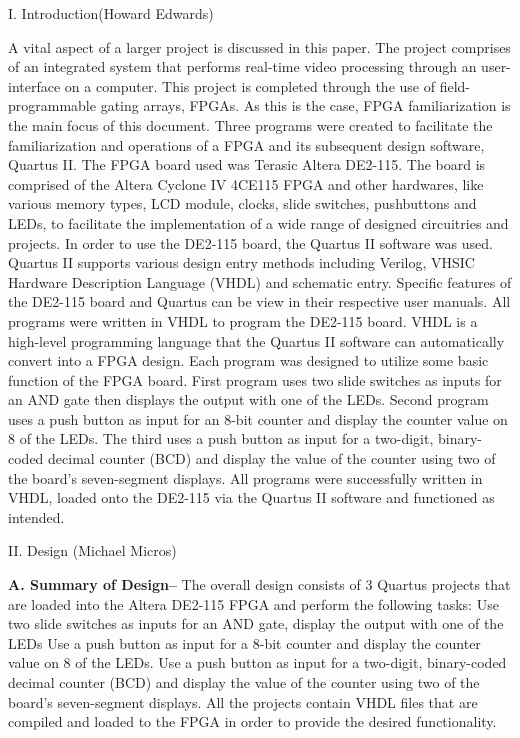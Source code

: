 \documentclass{article}
\begin{document}
\begin{multicols*}{2}
\begin{center}
\large{I. Introduction(Howard Edwards)}
\end{center}
A vital aspect of a larger project is discussed in this paper. The project comprises of an integrated system that performs real-time video processing through an user-interface on a computer. This project is completed through the use of field-programmable gating arrays, FPGAs. As this is the case, FPGA familiarization is the main focus of this document. Three programs were created to facilitate the familiarization and operations of a FPGA and its subsequent design software, Quartus II.
The FPGA board used was Terasic Altera DE2-115. The board is comprised of the Altera Cyclone IV 4CE115 FPGA and other hardwares, like various memory types, LCD module, clocks, slide switches, pushbuttons and LEDs, to facilitate the implementation of a wide range of designed circuitries and projects. In order to use the DE2-115 board, the Quartus II software was used. Quartus II supports various design entry methods including Verilog, VHSIC Hardware Description Language (VHDL) and schematic entry. Specific features of the DE2-115 board and Quartus can be view in their respective user manuals.
All programs were written in VHDL to program the DE2-115 board. VHDL is a high-level programming language that the Quartus II software can automatically convert into a FPGA design. Each program was designed to utilize some basic function of the FPGA board. First program uses two slide switches as inputs for an AND gate then displays the output with one of the LEDs. Second program uses a push button as input for an 8-bit counter and display the counter value on 8 of the LEDs. The third uses a push button as input for a two-digit, binary-coded decimal counter (BCD) and display the value of the counter using two of the board's seven-segment displays. All programs were successfully written in VHDL, loaded onto the DE2-115 via the Quartus II software and functioned as intended.



\begin{center}
{\large II. Design (Michael Micros)}
\end{center}

{\bf A. Summary of Design--}  
The overall design consists of 3 Quartus projects that are loaded into the Altera DE2-115 FPGA and perform the following tasks:
Use two slide switches as inputs for an AND gate, display the output with one of the LEDs
Use a push button as input for a 8-bit counter and display the counter value on 8 of the LEDs.
Use a push button as input for a two-digit, binary-coded decimal counter (BCD) and display the value of the counter using two of the board's seven-segment displays.
All the projects contain VHDL files that are compiled and loaded to the FPGA in order to provide the desired functionality.



\end{multicols*}
\end{document}
